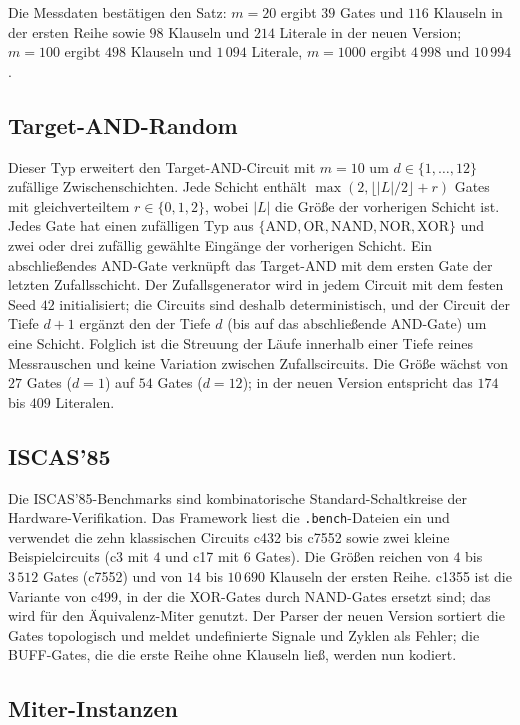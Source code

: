 Die Messdaten bestätigen den Satz: $m=20$ ergibt $39$ Gates und $116$ Klauseln in der ersten Reihe sowie $98$ Klauseln und $214$ Literale in der neuen Version; $m=100$ ergibt $498$ Klauseln und $1\,094$ Literale, $m=1000$ ergibt $4\,998$ und $10\,994$.

\subsection{Target-AND-Random}

Dieser Typ erweitert den Target-AND-Circuit mit $m=10$ um $d\in\{1,\ldots,12\}$ zufällige Zwischenschichten. Jede Schicht enthält $\max(2,\lfloor|L|/2\rfloor+r)$ Gates mit gleichverteiltem $r\in\{0,1,2\}$, wobei $|L|$ die Größe der vorherigen Schicht ist. Jedes Gate hat einen zufälligen Typ aus $\{\mathrm{AND},\mathrm{OR},\mathrm{NAND},\mathrm{NOR},\mathrm{XOR}\}$ und zwei oder drei zufällig gewählte Eingänge der vorherigen Schicht. Ein abschließendes AND-Gate verknüpft das Target-AND mit dem ersten Gate der letzten Zufallsschicht. Der Zufallsgenerator wird in jedem Circuit mit dem festen Seed $42$ initialisiert; die Circuits sind deshalb deterministisch, und der Circuit der Tiefe $d+1$ ergänzt den der Tiefe $d$ (bis auf das abschließende AND-Gate) um eine Schicht. Folglich ist die Streuung der Läufe innerhalb einer Tiefe reines Messrauschen und keine Variation zwischen Zufallscircuits. Die Größe wächst von $27$ Gates ($d=1$) auf $54$ Gates ($d=12$); in der neuen Version entspricht das $174$ bis $409$ Literalen.

\subsection{ISCAS'85}

Die ISCAS'85-Benchmarks \cite{brglez1985} sind kombinatorische Standard-Schaltkreise der Hardware-Verifikation. Das Framework liest die \texttt{.bench}-Dateien ein und verwendet die zehn klassischen Circuits c432 bis c7552 sowie zwei kleine Beispielcircuits (c3 mit $4$ und c17 mit $6$ Gates). Die Größen reichen von $4$ bis $3\,512$ Gates (c7552) und von $14$ bis $10\,690$ Klauseln der ersten Reihe. c1355 ist die Variante von c499, in der die XOR-Gates durch NAND-Gates ersetzt sind; das wird für den Äquivalenz-Miter genutzt. Der Parser der neuen Version sortiert die Gates topologisch und meldet undefinierte Signale und Zyklen als Fehler; die BUFF-Gates, die die erste Reihe ohne Klauseln ließ, werden nun kodiert.

\subsection{Miter-Instanzen}


